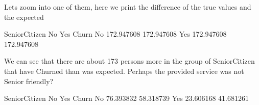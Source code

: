 \documentclass[letterpaper,10pt,english]{jupyterBook}
\begin{document}
\begin{sphinxVerbatim}[commandchars=\\\{\}]
\end{sphinxVerbatim}

\begin{sphinxVerbatim}
\end{sphinxVerbatim}

\sphinxAtStartPar
Lets zoom into one of them, here we print the difference of the true values and the expected

\begin{sphinxVerbatim}[commandchars=\\\{\}]
\PYG{p}{[}\PYG{p}{]}\PYG{p}{[}\PYG{p}{]}
\end{sphinxVerbatim}

\begin{sphinxVerbatim}[commandchars=\\\{\}]
SeniorCitizen          No         Yes
Churn                                
No             172.947608 \PYGZhy{}172.947608
Yes           \PYGZhy{}172.947608  172.947608
\end{sphinxVerbatim}

\sphinxAtStartPar
We can see that there are about 173 persons more in the group of SeniorCitizen that have Churned than was expected. Perhaps the provided service was not Senior friendly?

\begin{sphinxVerbatim}[commandchars=\\\{\}]
\end{sphinxVerbatim}

\begin{sphinxVerbatim}[commandchars=\\\{\}]
SeniorCitizen         No        Yes
Churn                              
No             76.393832  58.318739
Yes            23.606168  41.681261
\end{sphinxVerbatim}
\end{document}
